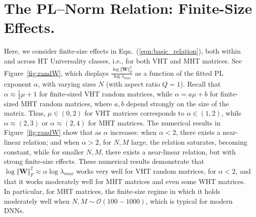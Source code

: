 {%
\section{The PL--Norm Relation: Finite-Size Effects.}
\label{sxn:appendix-finite-size}


Here, we consider finite-size effects in Eqn.~(\ref{eqn:basic_relation}), both within and across HT Universality classes, i.e., for both VHT and MHT matrices.
See Figure~\ref{fig:randW}, which  displays $\frac{\log\Vert\mathbf{W}\Vert^{2}_{F}}{\log\lambda_{max}}$ as a function of the fitted PL exponent $\alpha$, with varying sizes $N$ (with aspect ratio $Q=1$).
Recall that $\alpha \approx \frac{1}{2}\mu+1$ for finite-sized VHT random matrices, while $\alpha = a\mu+b$ for finite-sized MHT random matrices, where $a,b$ depend strongly on the size of the matrix.  Thus, $\mu\in(0,2)$ for VHT matrices corresponds to $\alpha\in(1,2)$, while $\alpha \approx(2,3)$ or $\alpha \approx(2,4)$ for MHT matrices.
The numerical results in Figure~\ref{fig:randW} show that as $\alpha$ increases:
when $\alpha<2$, there exists a near-linear relation; and
when $\alpha>2$, for $N,M$ large, the relation saturates, becoming constant, while for smaller $N,M$, there exists a near-linear relation, but with strong finite-size effects.
These numerical results demonstrate that $ \log\Vert\mathbf{W}\Vert^{2}_{F}\approx\alpha\log\lambda_{max} $ works very well for VHT random matrices, for $\alpha<2$, and that it works moderately well for MHT matrices and even some WHT matrices.
In particular, for MHT matrices, the finite-size regime in which it holds moderately well when $N,M\sim\mathcal{O}(100-1000)$, which is typical for modern DNNs. 

}
